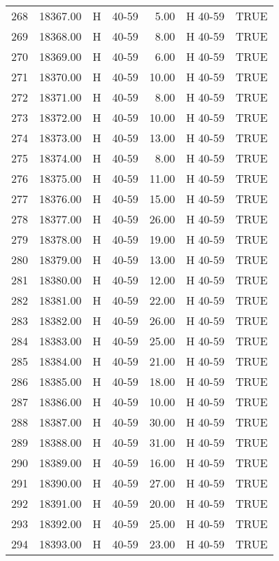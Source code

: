 \begin{table}[ht]
\begin{tabular}{rrllrll}
  268 & 18367.00 & H & 40-59 & 5.00 & H 40-59 & TRUE \\ 
  269 & 18368.00 & H & 40-59 & 8.00 & H 40-59 & TRUE \\ 
  270 & 18369.00 & H & 40-59 & 6.00 & H 40-59 & TRUE \\ 
  271 & 18370.00 & H & 40-59 & 10.00 & H 40-59 & TRUE \\ 
  272 & 18371.00 & H & 40-59 & 8.00 & H 40-59 & TRUE \\ 
  273 & 18372.00 & H & 40-59 & 10.00 & H 40-59 & TRUE \\ 
  274 & 18373.00 & H & 40-59 & 13.00 & H 40-59 & TRUE \\ 
  275 & 18374.00 & H & 40-59 & 8.00 & H 40-59 & TRUE \\ 
  276 & 18375.00 & H & 40-59 & 11.00 & H 40-59 & TRUE \\ 
  277 & 18376.00 & H & 40-59 & 15.00 & H 40-59 & TRUE \\ 
  278 & 18377.00 & H & 40-59 & 26.00 & H 40-59 & TRUE \\ 
  279 & 18378.00 & H & 40-59 & 19.00 & H 40-59 & TRUE \\ 
  280 & 18379.00 & H & 40-59 & 13.00 & H 40-59 & TRUE \\ 
  281 & 18380.00 & H & 40-59 & 12.00 & H 40-59 & TRUE \\ 
  282 & 18381.00 & H & 40-59 & 22.00 & H 40-59 & TRUE \\ 
  283 & 18382.00 & H & 40-59 & 26.00 & H 40-59 & TRUE \\ 
  284 & 18383.00 & H & 40-59 & 25.00 & H 40-59 & TRUE \\ 
  285 & 18384.00 & H & 40-59 & 21.00 & H 40-59 & TRUE \\ 
  286 & 18385.00 & H & 40-59 & 18.00 & H 40-59 & TRUE \\ 
  287 & 18386.00 & H & 40-59 & 10.00 & H 40-59 & TRUE \\ 
  288 & 18387.00 & H & 40-59 & 30.00 & H 40-59 & TRUE \\ 
  289 & 18388.00 & H & 40-59 & 31.00 & H 40-59 & TRUE \\ 
  290 & 18389.00 & H & 40-59 & 16.00 & H 40-59 & TRUE \\ 
  291 & 18390.00 & H & 40-59 & 27.00 & H 40-59 & TRUE \\ 
  292 & 18391.00 & H & 40-59 & 20.00 & H 40-59 & TRUE \\ 
  293 & 18392.00 & H & 40-59 & 25.00 & H 40-59 & TRUE \\ 
  294 & 18393.00 & H & 40-59 & 23.00 & H 40-59 & TRUE \\ 

\end{tabular}
\end{table}
